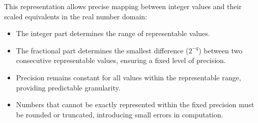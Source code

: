 This representation allows precise mapping between integer values and their scaled equivalents in the real number domain:
\begin{itemize}
    \item The integer part determines the range of representable values.
    \item The fractional part determines the smallest difference (\( 2^{-q} \)) between two consecutive representable values, ensuring a fixed level of precision.

\end{itemize}

\begin{itemize}
    \item Precision remains constant for all values within the representable range, providing predictable granularity.
    \item Numbers that cannot be exactly represented within the fixed precision must be rounded or truncated, introducing small errors in computation.
\end{itemize}



